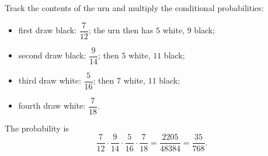 Track the contents of the urn and multiply the conditional probabilities:
\begin{itemize}
\item first draw black: $\dfrac{7}{12}$; the urn then has $5$ white, $9$ black;
\item second draw black: $\dfrac{9}{14}$; then $5$ white, $11$ black;
\item third draw white: $\dfrac{5}{16}$; then $7$ white, $11$ black;
\item fourth draw white: $\dfrac{7}{18}$.
\end{itemize}
The probability is
\[
\dfrac{7}{12}\cdot\dfrac{9}{14}\cdot\dfrac{5}{16}\cdot\dfrac{7}{18}=\dfrac{2205}{48384}=\boxed{\dfrac{35}{768}}.
\]
